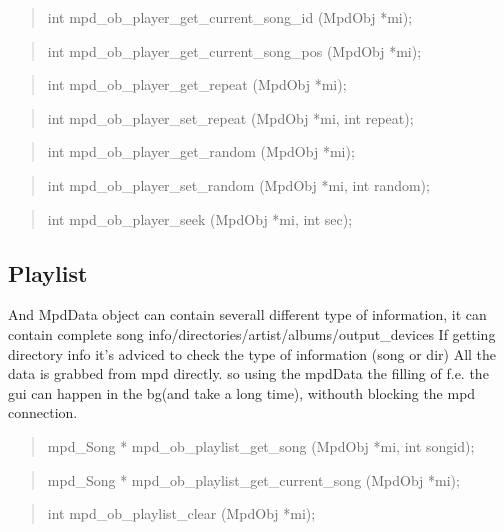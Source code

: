 \documentclass[a4paper,11pt]{article}
\begin{document}
	\begin{quote}
	int   mpd\_ob\_player\_get\_current\_song\_id (MpdObj *mi);
	\end{quote}
	
	\begin{quote}
	int   mpd\_ob\_player\_get\_current\_song\_pos (MpdObj *mi);
	\end{quote}
	
	\begin{quote}
	int  mpd\_ob\_player\_get\_repeat  (MpdObj *mi);
	\end{quote}
	
	\begin{quote}
	int  mpd\_ob\_player\_set\_repeat  (MpdObj *mi, int repeat);
	\end{quote}
	
	\begin{quote}
	int  mpd\_ob\_player\_get\_random  (MpdObj *mi);
	\end{quote}
	
	\begin{quote}
	int  mpd\_ob\_player\_set\_random  (MpdObj *mi, int random);
	\end{quote}
	
	\begin{quote}
	int   mpd\_ob\_player\_seek   (MpdObj *mi, int sec);
	\end{quote}
	
	\subsection{Playlist}
	
	
	And MpdData object can contain severall different type of information, it can contain complete song info/directories/artist/albums/output\_devices
	If getting directory info it's adviced to check the type of information (song or dir)
	All the data is grabbed from mpd directly.  so using the mpdData the filling of f.e. the gui can happen in the bg(and take a long time), withouth blocking the mpd connection.
	
	\begin{quote}
	mpd\_Song *  mpd\_ob\_playlist\_get\_song  (MpdObj *mi, int songid);
	\end{quote}
	
	\begin{quote}
	mpd\_Song *  mpd\_ob\_playlist\_get\_current\_song (MpdObj *mi);
	\end{quote}
	
	\begin{quote}
	int   mpd\_ob\_playlist\_clear   (MpdObj *mi);
	\end{quote}
	
\end{document}
